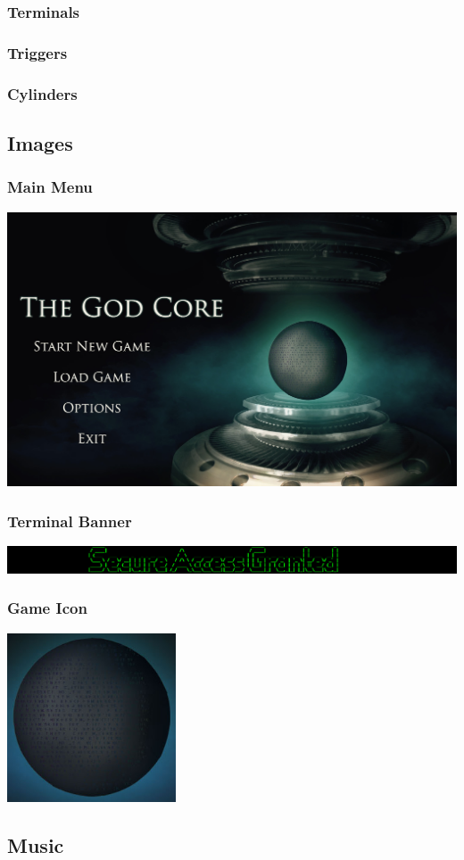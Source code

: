\documentclass{article}
\begin{document}
\subsubsection{Terminals}

\subsubsection{Triggers}

\tiny{}
\subsubsection{Cylinders}

\small{}
\subsection{Images}

\subsubsection{Main Menu}
	\includegraphics[width=18cm]{../Resources/Images/Main}
\subsubsection{Terminal Banner}
	\includegraphics[width=18cm]{../Resources/Images/banner}
\subsubsection{Game Icon}
	\includegraphics[width=5cm]{../Resources/Images/Core}
\subsection{Music}
\end{document}
